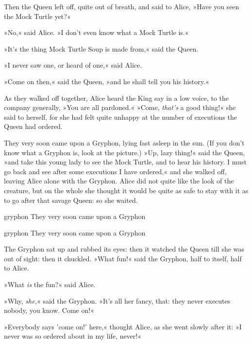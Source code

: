 Then the Queen left off, quite out of breath, and said to Alice, »Have you seen the Mock Turtle yet?«

»No,« said Alice. »I don't even know what a Mock Turtle is.«

»It's the thing Mock Turtle Soup is made from,« said the Queen.

»I never saw one, or heard of one,« said Alice.

»Come on then,« said the Queen, »and he shall tell you his history.«

As they walked off together, Alice heard the King say in a low voice, to the company generally, »You are all pardoned.« »Come, \textit{that's} a good thing!« she said to herself, for she had felt quite unhappy at the number of executions the Queen had ordered.

They very soon came upon a Gryphon, lying fast asleep in the sun. (If you don't know what a Gryphon is, look at the picture.) »Up, lazy thing!« said the Queen, »and take this young lady to see the Mock Turtle, and to hear his history. I must go back and see after some executions I have ordered,« and she walked off, leaving Alice alone with the Gryphon. Alice did not quite like the look of the creature, but on the whole she thought it would be quite as safe to stay with it as to go after that savage Queen: so she waited.

\begin{pictures}
	\begin{letter}
		\begin{bwbigpic}
			[1.1]
			{gryphon}
			{They very soon came upon a Gryphon}
		\end{bwbigpic}
	\end{letter}
	\begin{a4}
		\begin{bwbigpic}
			[1.0]
			{gryphon}
			{They very soon came upon a Gryphon}
		\end{bwbigpic}
	\end{a4}
\end{pictures}

The Gryphon sat up and rubbed its eyes: then it watched the Queen till she was out of sight: then it chuckled. »What fun!« said the Gryphon, half to itself, half to Alice.

»What \textit{is} the fun?« said Alice.

»Why, \textit{she,}« said the Gryphon. »It's all her fancy, that: they never executes nobody, you know. Come on!«

»Everybody says 'come on!' here,« thought Alice, as she went slowly after it: »I never was so ordered about in my life, never!«


